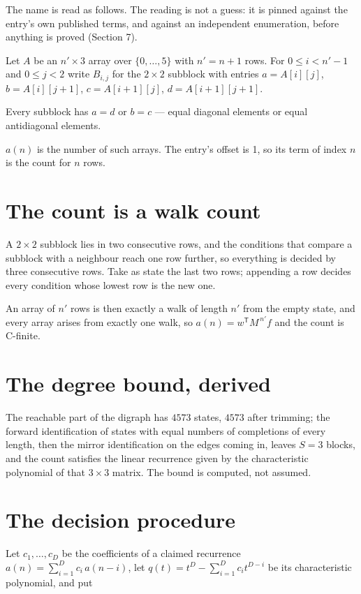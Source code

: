 \documentclass[11pt]{article}
\theoremstyle{definition}
\begin{document}
The name is read as follows. The reading is not a guess: it is pinned against the entry's own published terms, and against an independent enumeration, before anything is proved (Section 7).

Let $A$ be an $n' \times 3$ array over $\{0,\dots,5\}$ with $n' = n + 1$ rows. For $0 \le i < n'-1$ and $0 \le j < 2$ write $B_{i,j}$ for the $2\times2$ subblock with entries $a = A[i][j]$, $b = A[i][j{+}1]$, $c = A[i{+}1][j]$, $d = A[i{+}1][j{+}1]$.

Every subblock has $a = d$ or $b = c$ --- equal diagonal elements or equal antidiagonal elements.

$a(n)$ is the number of such arrays. The entry's offset is 1, so its term of index $n$ is the count for $n$ rows.

\section{The count is a walk count}

A $2\times2$ subblock lies in two consecutive rows, and the conditions that compare a subblock with a neighbour reach one row further, so everything is decided by three consecutive rows. Take as state the last two rows; appending a row decides every condition whose lowest row is the new one.

An array of $n'$ rows is then exactly a walk of length $n'$ from the empty state, and every array arises from exactly one walk, so $a(n) = w^{\mathsf T}M^{\,n'}f$ and the count is C-finite.

\section{The degree bound, derived}

The reachable part of the digraph has $4573$ states, $4573$ after trimming; the forward identification of states with equal numbers of completions of every length, then the mirror identification on the edges coming in, leaves $S = 3$ blocks, and the count satisfies the linear recurrence given by the characteristic polynomial of that $3\times3$ matrix. The bound is computed, not assumed.

\section{The decision procedure}

Let $c_1,\dots,c_D$ be the coefficients of a claimed recurrence $a(n) = \sum_{i=1}^{D} c_i\,a(n-i)$, let $q(t) = t^{D} - \sum_{i=1}^{D} c_i t^{D-i}$ be its characteristic polynomial, and put
\end{document}
